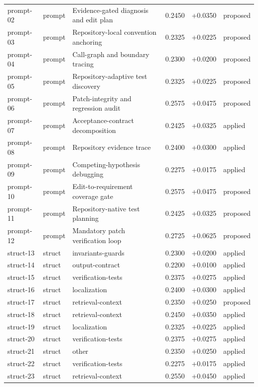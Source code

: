 \begin{center}
\begin{longtable}{llp{5.2cm}rrl}
prompt-02 & prompt & Evidence-gated diagnosis and edit plan & 0.2450 & +0.0350 & proposed \\
prompt-03 & prompt & Repository-local convention anchoring & 0.2325 & +0.0225 & proposed \\
prompt-04 & prompt & Call-graph and boundary tracing & 0.2300 & +0.0200 & proposed \\
prompt-05 & prompt & Repository-adaptive test discovery & 0.2325 & +0.0225 & proposed \\
prompt-06 & prompt & Patch-integrity and regression audit & 0.2575 & +0.0475 & proposed \\
prompt-07 & prompt & Acceptance-contract decomposition & 0.2425 & +0.0325 & applied \\
prompt-08 & prompt & Repository evidence trace & 0.2400 & +0.0300 & applied \\
prompt-09 & prompt & Competing-hypothesis debugging & 0.2275 & +0.0175 & applied \\
prompt-10 & prompt & Edit-to-requirement coverage gate & 0.2575 & +0.0475 & proposed \\
prompt-11 & prompt & Repository-native test planning & 0.2425 & +0.0325 & proposed \\
prompt-12 & prompt & Mandatory patch verification loop & 0.2725 & +0.0625 & proposed \\
struct-13 & struct & invariants-guards & 0.2300 & +0.0200 & applied \\
struct-14 & struct & output-contract & 0.2200 & +0.0100 & applied \\
struct-15 & struct & verification-tests & 0.2375 & +0.0275 & applied \\
struct-16 & struct & localization & 0.2400 & +0.0300 & applied \\
struct-17 & struct & retrieval-context & 0.2350 & +0.0250 & proposed \\
struct-18 & struct & retrieval-context & 0.2450 & +0.0350 & applied \\
struct-19 & struct & localization & 0.2325 & +0.0225 & applied \\
struct-20 & struct & verification-tests & 0.2375 & +0.0275 & applied \\
struct-21 & struct & other & 0.2350 & +0.0250 & applied \\
struct-22 & struct & verification-tests & 0.2275 & +0.0175 & applied \\
struct-23 & struct & retrieval-context & 0.2550 & +0.0450 & applied \\

\end{longtable}
\end{center}
